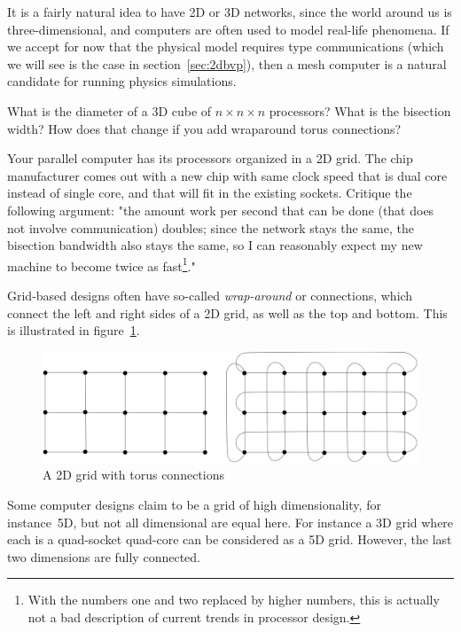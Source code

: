 It is a fairly natural idea to have 2D or 3D networks, since the world
around us is three-dimensional, and computers are often used to model
real-life phenomena. If we accept for now that the physical model
requires  type communications (which we
will see is the case in section~\ref{sec:2dbvp}), then a mesh computer
is a natural candidate for running physics simulations.

\begin{exercise}
  What is the diameter of a 3D cube of $n\times n\times n$ processors? What is the
  bisection width? How does that change if you add wraparound torus
  connections?
\end{exercise}

\begin{exercise}
  Your parallel computer has its processors organized in a 2D grid.
  The chip manufacturer comes out with a new chip with same clock
  speed that is dual core instead of single core, and that will fit in
  the existing sockets. Critique the following argument: "the amount
  work per second that can be done (that does not involve communication)
  doubles; since the network stays the same, the bisection bandwidth
  also stays the same, so I can reasonably expect my new machine to
  become twice as fast\footnote{With the numbers one and two replaced
    by higher numbers, this is actually not a bad description of
    current trends in processor design.}."
\end{exercise}

Grid-based designs often have so-called \emph{wrap-around} or
 connections, which connect the left and right sides
of a 2D grid, as well as the top and bottom. This is illustrated in
figure~\ref{fig:torus}.
\begin{figure}[th]
  \includegraphics[scale=.11]{graphics/torus}
  \caption{A 2D grid with torus connections}
  \label{fig:torus}
\end{figure}

Some computer designs claim to be a grid of high dimensionality, for
instance~5D, but not all dimensional are equal here. For instance a 3D
grid where each  is a quad-socket 
quad-core can be considered as a
5D grid. However, the last two dimensions are fully connected.

